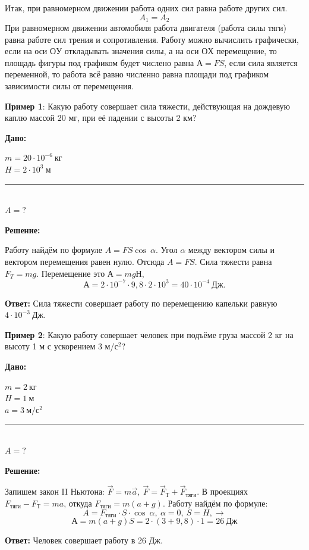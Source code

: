 \documentclass[a5paper, 10pt]{diss_4}
\renewcommand{\'}{\,'}
\begin{document}
  Итак, при равномерном движении работа одних сил равна работе других сил.
\[A_1=A_2\]
  При равномерном движении автомобиля работа двигателя (работа силы тяги)
равна работе сил трения и сопротивления. Работу можно вычислить
графически, если на оси $ОУ$ откладывать значения силы, а на оси $ОХ$ перемещение,
то площадь фигуры под графиком будет числено равна $А = FS$, если сила
является переменной, то работа всё равно численно равна площади под графиком
зависимости силы от перемещения.


  \textbf{Пример 1}: Какую работу совершает сила тяжести, действующая на
дождевую каплю массой 20 мг, при её падении с высоты 2 км?

\hspace{1cm}\textbf{Дано:}\hspace{.3cm}
\parbox[t]{4cm}{
$m=20\cdot10^{-6}\ кг$\\
$H=2\cdot10^3\ м$\\
\rule{4cm}{.4pt}\\
$A=?$\\
}

 \textbf{Решение:}

  Работу найдём по формуле $A=FS\cos\ \alpha$. Угол $\alpha$ между вектором силы
 и вектором перемещения равен нулю. Отсюда $A=FS$. Сила тяжести равна
$F_T=mg$. Перемещение это $А=mgН$,
\[
А=2\cdot10^{-7}\cdot9,8\cdot2\cdot10^3=40\cdot10^{-4}\ Дж.
\]

  \textbf{Ответ:} Сила тяжести совершает работу по перемещению капельки
равную $4\cdot10^{-3}\ Дж$.


  \textbf{Пример 2}: Какую работу совершает человек при подъёме груза массой
2 кг на высоту 1 м с ускорением 3 м/$с^2$?

\hspace{1cm}\textbf{Дано:}\hspace{.3cm}
\parbox[t]{4cm}{
$m=2\ кг$\\
$H=1\ м$\\
$a=3\ м/с^2$\\
\rule{4cm}{.4pt}\\
$A=?$
}

 \textbf{Решение:}

 Запишем закон II Ньютона: $\vec{F}=m\vec{a},\
\vec{F}=\vec{F}_Т+\vec{F}_{тяги}$. В проекциях $F_{тяги}-F_{Т}=ma$, откуда
$F_{тяги}=m(a+g)$. Работу найдём по формуле:
\[
A=F_{тяги}\cdot S\cdot \cos\ \alpha,\ \alpha=0,\ S=H,\to
\]
\[
А=m(a+g)S=2\cdot(3+9,8)\cdot1=26\ Дж
\]

  \textbf{Ответ:} Человек совершает работу в 26 Дж.
\end{document}
